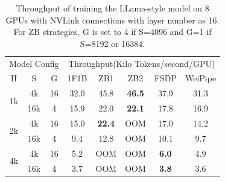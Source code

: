 \documentclass[sigplan,screen]{acmart}
\begin{document}

\begin{table}[!ht]
\centering
\caption{Throughput of training the LLama-style model on 8 GPUs with NVLink connections with layer number as 16. For ZB strategies, G is set to 4 if S=4096 and G=1 if S=8192 or 16384.}
\begin{tabular}{ccc|ccccc}
\hline
\multicolumn{3}{c|}{Model Config} & \multicolumn{5}{c}{Throughput(Kilo Tokens/second/GPU)}              \\
H                    & S    & G   & 1F1B & ZB1           & ZB2           & FSDP         & WeiPipe \\ \hline
\multirow{2}{*}{1k}  & 4k   & 16  & 32.0 & 45.8          & \textbf{46.5} & 37.9         & 31.3    \\
                     & 16k  & 4   & 15.9 & 22.0          & \textbf{22.1} & 17.8         & 16.9    \\ \hline
\multirow{2}{*}{2k}  & 4k   & 16  & 15.0 & \textbf{22.4} & OOM           & 17.0        & 14.2    \\
                     & 16k  & 4   & 9.4 & 12.8         & OOM & 10.1        & 9.7  \\ \hline
\multirow{2}{*}{4k}  & 4k   & 16  & 5.2  & OOM           & OOM           & \textbf{6.0} & 4.9     \\
                     & 16k  & 4   & 3.7  & OOM           & OOM           & \textbf{3.8} & 3.6     \\ \hline
\end{tabular}
\label{tab:only_nvlink}
\end{table}
\end{document}
